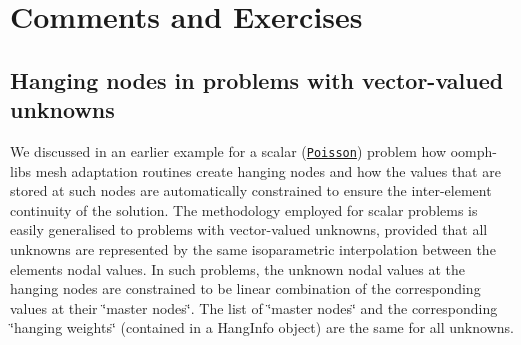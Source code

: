 



 

\hypertarget{index_comments}{}\section{Comments and Exercises}\label{index_comments}
\hypertarget{index_hang_vector}{}\subsection{Hanging nodes in problems with vector-\/valued unknowns}\label{index_hang_vector}
We discussed in an earlier example for a scalar (\href{../../../poisson/two_d_poisson_adapt/html/index.html}{\tt Poisson}) problem how {\ttfamily oomph-\/lib\textquotesingle{}s} mesh adaptation routines create hanging nodes and how the values that are stored at such nodes are automatically constrained to ensure the inter-\/element continuity of the solution. The methodology employed for scalar problems is easily generalised to problems with vector-\/valued unknowns, provided that all unknowns are represented by the same isoparametric interpolation between the elements\textquotesingle{} nodal values. In such problems, the unknown nodal values at the hanging nodes are constrained to be linear combination of the corresponding values at their \char`\"{}master nodes\char`\"{}. The list of \char`\"{}master nodes\char`\"{} and the corresponding \char`\"{}hanging weights\char`\"{} (contained in a {\ttfamily Hang\+Info} object) are the same for all unknowns.

